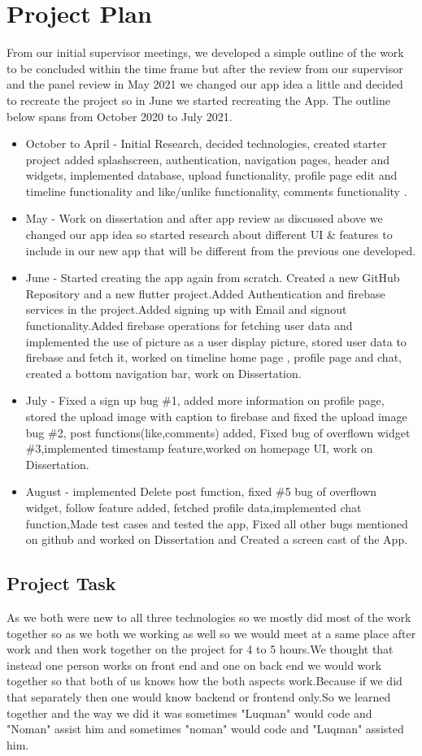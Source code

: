 \section{Project Plan}
From our initial supervisor meetings, we developed a simple outline of the work to be concluded within the time frame but after the review from our supervisor and the panel review in May 2021 we changed our app idea a little and decided to recreate the project so in June we started recreating the App. The outline below spans from October 2020 to July 2021.
\begin{itemize}
\item October to April - Initial Research, decided technologies, created starter project added splashscreen, authentication, navigation pages, header and widgets, implemented database, upload functionality, profile page edit and timeline functionality and like/unlike functionality, comments functionality .
\item May - Work on dissertation and after app review as discussed above we changed our app idea so started research about different UI \& features to include in our new app that will be  different from the previous one developed.
\item June - Started creating the app again from scratch. Created a new GitHub Repository and a new flutter project.Added Authentication and firebase services in the project.Added signing up with Email and signout functionality.Added firebase operations for fetching user data and implemented the use of picture as a user display picture, stored user data to firebase and fetch it, worked on timeline home page , profile page and chat, created a bottom navigation bar, work on Dissertation.
\item July - Fixed a sign up bug \#1, added more information on profile page, stored the upload image with caption to firebase and fixed the upload image bug \#2, post functions(like,comments) added, Fixed bug of overflown widget \#3,implemented timestamp feature,worked on homepage UI, work on Dissertation.
\item August - implemented Delete post function, fixed \#5 bug of overflown widget, follow feature added, fetched profile data,implemented chat function,Made test cases and tested the app, Fixed all other bugs mentioned on github and worked on Dissertation and Created a screen cast of the App.
\end{itemize}

\subsection{Project Task}
As we both were new to all three technologies so we mostly did most of the work together so as we both we working as well so we would meet at a same place after work and then work together on the project for 4 to 5 hours.We thought that instead one person works on front end and one on back end we would work together so that both of us knows how the both aspects work.Because if we did that separately then one would know backend or frontend only.So we learned together and the way we did it was sometimes "Luqman" would code and "Noman" assist him and sometimes "noman" would code and "Luqman" assisted him.

